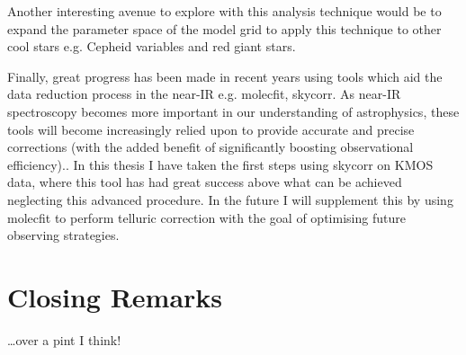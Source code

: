 Another interesting avenue to explore with this analysis technique would be to expand the parameter space of the model grid to apply this technique to other cool stars e.g. Cepheid variables and red giant stars.


Finally, great progress has been made in recent years using tools which aid the data reduction process in the near-IR e.g. {\sc molecfit, skycorr}.
As near-IR spectroscopy becomes more important in our understanding of astrophysics, these tools will become increasingly relied upon to provide accurate and precise corrections (with the added benefit of significantly boosting observational efficiency)..
In this thesis I have taken the first steps using {\sc skycorr} on KMOS data, where this tool has had great success above what can be achieved neglecting this advanced procedure.
In the future I will supplement this by using {\sc molecfit} to perform telluric correction with the goal of optimising future observing strategies.


\section{Closing Remarks} %
\label{sec:closing_remarks}

\ldots over a pint I think!

% 
